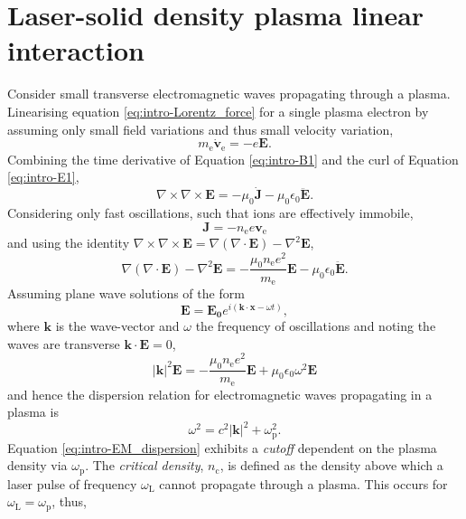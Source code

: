 \section{Laser-solid density plasma linear interaction}\label{sec:intro-lasersolidplasma_linear}
Consider small transverse electromagnetic waves propagating through a plasma. Linearising equation \ref{eq:intro-Lorentz_force} for a single plasma electron by assuming only small field variations and thus small velocity variation,
\begin{equation}\label{eq:intro-EOM_linear}
	m_\mathrm{e}  \dot{\mathbf{v}}_\mathrm{e} = -e\mathbf{E}.
\end{equation}
Combining the time derivative of Equation \ref{eq:intro-B1} and the curl of Equation \ref{eq:intro-E1},
\begin{equation}
	\nabla\times\nabla \times \mathbf{E}= - \mu_0 \dot{\mathbf{J} }- \mu_0\epsilon_0 \ddot{\mathbf{E}}.
\end{equation}
Considering only fast oscillations, such that ions are effectively immobile,
\begin{equation}
	\mathbf{J} = - n_\mathrm{e} e\mathbf{v}_\mathrm{e}
\end{equation}
and using the identity $\nabla\times\nabla \times \mathbf{E} = \nabla(\nabla\cdot \mathbf{E}) - \nabla^2\mathbf{E}$,
\begin{equation}
	\nabla(\nabla\cdot \mathbf{E}) - \nabla^2\mathbf{E} = -\frac{\mu_0 n_\mathrm{e} e^2}{m_\mathrm{e}} \mathbf{E}  - \mu_0 \epsilon_0 \ddot{\mathbf{E}}.
\end{equation} 
Assuming plane wave solutions of the form
\begin{equation}
	\mathbf{E} = \mathbf{E_0}e^{i(\mathbf{k}\cdot \mathbf{x}-\omega t)},
\end{equation}
where $\mathbf{k}$ is the wave-vector and $\omega$ the frequency of oscillations and noting the waves are transverse $\mathbf{k}\cdot \mathbf{E} = 0$,
\begin{equation}
	|\mathbf{k}|^2 \mathbf{E} = -\frac{\mu_0 n_\mathrm{e} e^2}{m_\mathrm{e}}\mathbf{E} + \mu_0\epsilon_0\omega^2\mathbf{E}
\end{equation}
and hence the dispersion relation for electromagnetic waves propagating in a plasma is
\begin{equation}\label{eq:intro-EM_dispersion}
	\omega^2  = c^2|\mathbf{k}|^2  + \omega_\mathrm{p}^2.
\end{equation}
Equation \ref{eq:intro-EM_dispersion} exhibits a \textit{cutoff} dependent on the plasma density via $\omega_\mathrm{p}$. The \textit{critical density}, $n_\mathrm{c}$, is defined as the density above which a laser pulse of frequency $\omega_\mathrm{L}$ cannot propagate through a plasma. This occurs for $\omega_\mathrm{L} = \omega_\mathrm{p}$, thus,
